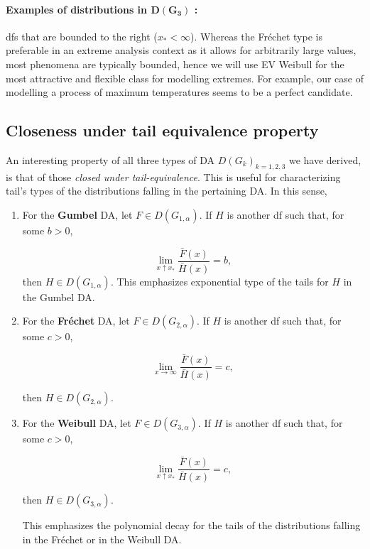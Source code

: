 \vspace{-0.1cm}
\paragraph*{Examples of distributions in $\boldsymbol{D(G_{3})}$ :} dfs that are bounded to the right ($x_*<\infty$). Whereas the Fréchet type is preferable in an extreme analysis context as it allows for arbitrarily large values, most phenomena are typically bounded, hence we will use EV Weibull for the most attractive and flexible class for modelling extremes. For example, our case of modelling a process of maximum temperatures seems to be a perfect candidate.


\subsection{Closeness under tail equivalence property} 
An interesting property of all three types of DA $D(G_{k})_{k=1,2,3}$ we have derived, is that of those \emph{closed under tail-equivalence}. This is useful for characterizing tail's types of the distributions falling in the pertaining DA. In this sense,

\begin{enumerate}
	\item For the \textbf{Gumbel} DA,  let $F\in D(G_{1,\alpha})$. If $H$ is another df such that, for some $b>0$, 
	
	\begin{equation}
	\displaystyle{\lim_{ x \uparrow x_*}} \frac{\bar{F}(x)}{\bar{H}(x)}=b,
	\end{equation}
	then $H\in D(G_{1,\alpha})$. This emphasizes exponential type of the  tails for $H$ in the Gumbel DA.
	
	\item For the \textbf{Fréchet} DA, let $F\in D(G_{2,\alpha})$. If $H$ is another df such that, for some $c>0$, 
	
	\begin{equation}
	\displaystyle{\lim_{ x \to\infty}} \frac{\bar{F}(x)}{\bar{H}(x)}=c,
	\end{equation}
	
	then $H\in D(G_{2,\alpha})$.
	
	\item For the \textbf{Weibull} DA,  let $F\in D(G_{3,\alpha})$. If $H$ is another df such that, for some $c>0$, 
	
	\begin{equation}
	\displaystyle{\lim_{ x  \uparrow  x_*}} \frac{\bar{F}(x)}{\bar{H}(x)}=c,
	\end{equation}
	
	then $H\in D(G_{3,\alpha})$.
	
	This emphasizes the polynomial decay for the tails of the distributions falling in the Fréchet or in the Weibull DA.
\end{enumerate}



